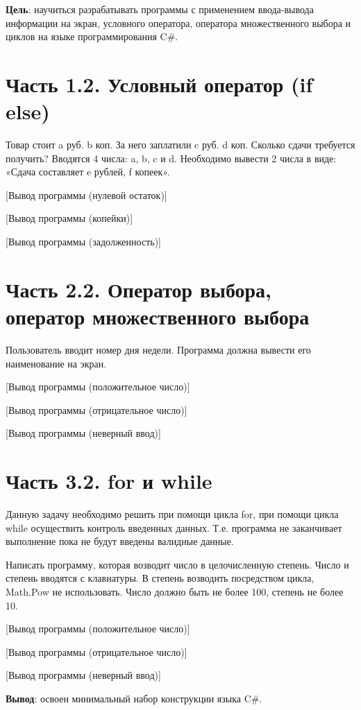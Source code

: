 \documentclass{bsuir}
\newcommand{\csharp}{C{\liberationrm\#}}
\begin{document}
    \maketitle

    \textbf{Цель}: научиться разрабатывать программы с применением ввода-вывода
    информации на экран, условного оператора, оператора множественного выбора и
    циклов на языке программирования \csharp.

    \section*{Часть 1.2. Условный оператор (if else)}

    Товар стоит a руб. b коп. За него заплатили c руб. d коп. Сколько сдачи
    требуется получить? Вводятся 4 числа: a, b, c и d. Необходимо вывести 2 числа в
    виде: «Сдача составляет e рублей, f копеек».


    [Вывод программы (нулевой остаток)]

    [Вывод программы (копейки)]

    [Вывод программы (задолженность)]

    \section*{Часть 2.2. Оператор выбора, оператор множественного выбора}

    Пользователь вводит номер дня недели. Программа должна вывести его наименование
    на экран.


    [Вывод программы (положительное число)]

    [Вывод программы (отрицательное число)]

    [Вывод программы (неверный ввод)]

    \section*{Часть 3.2. for и while}

    Данную задачу необходимо решить при помощи цикла for, при помощи цикла while
    осуществить контроль введенных данных. Т.е. программа не заканчивает выполнение
    пока не будут введены валидные данные.

    Написать программу, которая возводит число в целочисленную степень. Число и
    степень вводятся с клавиатуры. В степень возводить посредством цикла, Math.Pow
    не использовать. Число должно быть не более 100, степень не более 10.


    [Вывод программы (положительное число)]

    [Вывод программы (отрицательное число)]

    [Вывод программы (неверный ввод)]

    \textbf{Вывод}: освоен минимальный набор конструкции языка \csharp.
\end{document}
